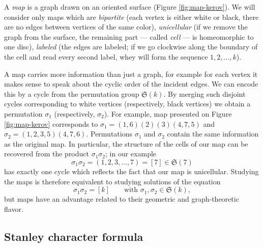 \documentclass{emsprocart}
\theoremstyle{definition}
\begin{document}
A \emph{map} is a graph drawn on an oriented surface (Figure \ref{fig:map-kerov}). 
We will consider only maps which are \emph{bipartite} 
(each vertex is either white or black, there are no edges between vertices of the same color),
\emph{unicellular} (if we remove the graph from the surface, the remaining part --- called \emph{cell} --- is homeomorphic to one disc), \emph{labeled} (the edges are labeled; if we go clockwise along the boundary of the cell and read every second label, whey will form the sequence $1,2,\dots,k$).

A map carries more information than just a graph, for example for each vertex it makes sense to speak about
the cyclic order of the incident edges.
We can encode this by a cycle from the permutation group ${\mathfrak{S}({k})}$.
By merging such disjoint cycles corresponding to white vertices (respectively, black vertices) we obtain a permutation $\sigma_1$ (respectively, $\sigma_2$). For example, map presented on Figure \ref{fig:map-kerov} corresponds to 
$\sigma_1=(1,6)(2)(3)(4,7,5)$ and $\sigma_2=(1,2,3,5)(4,7,6)$. Permutations $\sigma_1$ and $\sigma_2$ contain the same
information as the original map. In particular, the structure of the cells of our map can be recovered from the 
product $\sigma_1 \sigma_2$; in our example
$$ \sigma_1 \sigma_2 = (1,2,3,\dots,7) = [7] \in {\mathfrak{S}({7})}$$
has exactly one cycle which reflects the fact that our map is unicellular. 
Studying the maps is therefore equivalent to studying solutions of the equation
$$ \sigma_1 \sigma_2 = [k]\qquad \text{with }\sigma_1,\sigma_2\in {\mathfrak{S}({k})},$$ 
but maps have an advantage related to their geometric and graph-theoretic flavor.

\subsection{Stanley character formula}
\end{document}
